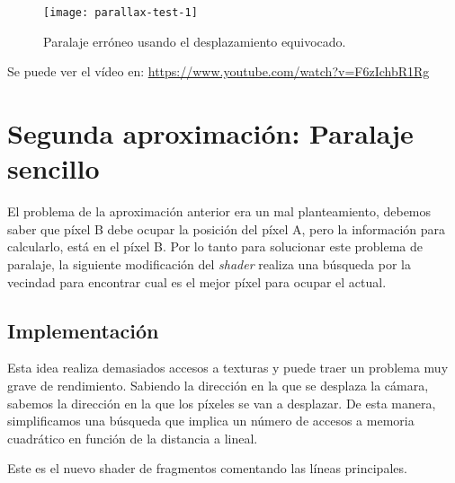 \begin{figure}[H]
  \centering
  \texttt{[image: parallax-test-1]}
  \caption{Paralaje erróneo usando el desplazamiento equivocado.}
  \label{fig:parallax-test-1}
\end{figure}
\FloatBarrier

Se puede ver el vídeo en: \url{https://www.youtube.com/watch?v=F6zIchbR1Rg}

\section{Segunda aproximación: Paralaje sencillo}
El problema de la aproximación anterior era un mal planteamiento, debemos saber que píxel B debe ocupar la posición del píxel A, pero la información para calcularlo, está en el píxel B. Por lo tanto para solucionar este problema de paralaje, la siguiente modificación del \textit{shader} realiza una búsqueda por la vecindad para encontrar cual es el mejor píxel para ocupar el actual.

\subsection{Implementación}
Esta idea realiza demasiados accesos a texturas y puede traer un problema muy grave de rendimiento. Sabiendo la dirección en la que se desplaza la cámara, sabemos la dirección en la que los píxeles se van a desplazar. De esta manera, simplificamos una búsqueda que implica un número de accesos a memoria cuadrático en función de la distancia a lineal.

Este es el nuevo shader de fragmentos comentando las líneas principales.

